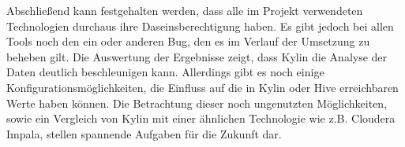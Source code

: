 \documentclass[a4paper,11pt,utf8]{scrartcl}
\begin{document}
Abschließend kann festgehalten werden, dass alle im Projekt verwendeten Technologien durchaus ihre Daseinsberechtigung haben. Es gibt jedoch bei allen Tools noch den ein oder anderen Bug, den es im Verlauf der Umsetzung zu beheben gilt. Die Auswertung der Ergebnisse zeigt, dass Kylin die Analyse der Daten deutlich beschleunigen kann. Allerdings gibt es noch einige Konfigurationsmöglichkeiten, die Einfluss auf die in Kylin oder Hive erreichbaren Werte haben können. Die Betrachtung dieser noch ungenutzten Möglichkeiten, sowie ein Vergleich von Kylin mit einer ähnlichen Technologie wie z.B. Cloudera Impala, stellen spannende Aufgaben für die Zukunft dar.
\end{document}
